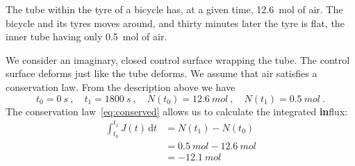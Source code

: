 \documentclass[a4paper,12pt,%
onecolumn,oneside,%
british%
]{memoir}
\newcommand*{\di}{\mathrm{d}}%
\renewcommand*{\|}[1][]{\nonscript\:#1\vert\nonscript\:\mathopen{}}
\newcommand*{\yti}{t_{0}}
\newcommand*{\ytf}{t_{1}}
\newcommand*{\yN}{N}
\newcommand*{\yJ}{J}
\begin{document}
%
The tube within the tyre of a bicycle has, at a given time, \qty{12.6}{mol} of air.
The bicycle and its tyres moves around, and thirty minutes later the tyre is flat, the inner tube having only \qty{0.5}{mol} of air.

We consider an imaginary, closed control surface wrapping the tube. The control surface deforms just like the tube deforms. We assume that air satisfies a conservation law. From the description above we have
\begin{equation*}
  \yti=\qty{0}{s} \ ,\quad
  \ytf=\qty{1800}{s} \ ,\quad
  \yN(\yti)=\qty{12.6}{mol} \ ,\quad
  \yN(\ytf)=\qty{0.5}{mol} \ .
\end{equation*}
The conservation law~\eqref{eq:conserved} allows us to calculate the integrated \textbf{in}flux:
\begin{equation*}
  \begin{split}
    \int_{\yti}^{\ytf}\!\!\yJ(t)\,\di t &= \yN(\ytf) - \yN(\yti)
    \\&= \qty{0.5}{mol} - \qty{12.6}{mol}
    \\&= \qty{-12.1}{mol}
  \end{split}
\end{equation*}
\end{document}
